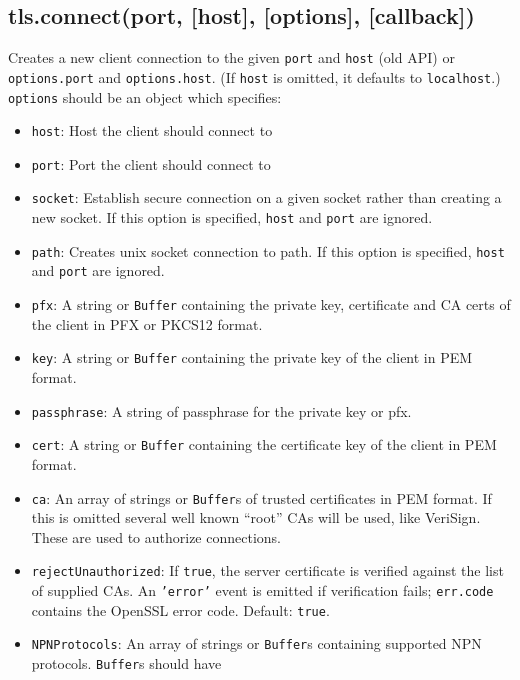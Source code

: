 \subsection{tls.connect(port, {[}host{]}, {[}options{]},
{[}callback{]})}\label{tls.connectport-host-options-callback}

Creates a new client connection to the given \texttt{port} and
\texttt{host} (old API) or \texttt{options.port} and
\texttt{options.host}. (If \texttt{host} is omitted, it defaults to
\texttt{localhost}.) \texttt{options} should be an object which
specifies:

\begin{itemize}
\item
  \texttt{host}: Host the client should connect to
\item
  \texttt{port}: Port the client should connect to
\item
  \texttt{socket}: Establish secure connection on a given socket rather
  than creating a new socket. If this option is specified, \texttt{host}
  and \texttt{port} are ignored.
\item
  \texttt{path}: Creates unix socket connection to path. If this option
  is specified, \texttt{host} and \texttt{port} are ignored.
\item
  \texttt{pfx}: A string or \texttt{Buffer} containing the private key,
  certificate and CA certs of the client in PFX or PKCS12 format.
\item
  \texttt{key}: A string or \texttt{Buffer} containing the private key
  of the client in PEM format.
\item
  \texttt{passphrase}: A string of passphrase for the private key or
  pfx.
\item
  \texttt{cert}: A string or \texttt{Buffer} containing the certificate
  key of the client in PEM format.
\item
  \texttt{ca}: An array of strings or \texttt{Buffer}s of trusted
  certificates in PEM format. If this is omitted several well known
  ``root'' CAs will be used, like VeriSign. These are used to authorize
  connections.
\item
  \texttt{rejectUnauthorized}: If \texttt{true}, the server certificate
  is verified against the list of supplied CAs. An \texttt{'error'}
  event is emitted if verification fails; \texttt{err.code} contains the
  OpenSSL error code. Default: \texttt{true}.
\item
  \texttt{NPNProtocols}: An array of strings or \texttt{Buffer}s
  containing supported NPN protocols. \texttt{Buffer}s should have

\end{itemize}
